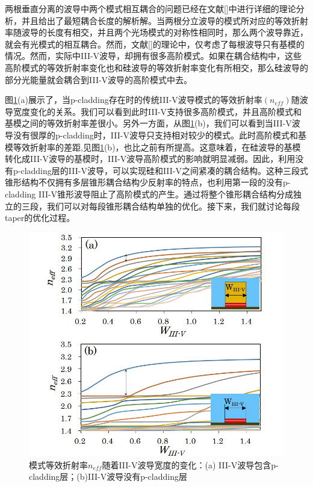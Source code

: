 两根垂直分离的波导中两个模式相互耦合的问题已经在文献[]中进行详细的理论分析，并且给出了最短耦合长度的解析解。当两根分立波导的模式所对应的等效折射率随波导的长度有相交，并且两个光场模式的对称性相同时，那么两个波导靠近，就会有光模式的相互耦合。然而，文献[]的理论中，仅考虑了每根波导只有基模的情况。然而，实际中III-V波导，却拥有很多高阶模式。如果在耦合结构中，这些高阶模式的等效折射率变化也和硅波导的等效折射率变化有所相交，那么硅波导的部分光能量就会耦合到III-V波导的高阶模式中去。

图\ref{fig_ch3_multimode}(a)展示了，当p-cladding存在时的传统III-V波导模式的等效折射率$(n_{eff})$随波导宽度变化的关系。我们可以看到此时III-V支持很多高阶模式，并且高阶模式和基模之间的等效折射率差很小。另外一方面，从图\ref{fig_ch3_multimode}(b)，我们可以看到当III-V波导没有很厚的p-cladding时，III-V波导只支持相对较少的模式。此时高阶模式和基模等效折射率的差距,见图\ref{fig_ch3_multimode}(b)，也比之前有所提高。这意味着，在硅波导的基模转化成III-V波导的基模时，III-V波导高阶模式的影响就明显减弱。因此，利用没有p-cladding层的III-V波导，可以实现硅和III-V之间紧凑的耦合结构。这种三段式锥形结构不仅拥有多层锥形耦合结构少反射率的特点\cite{kurczveil2013characterization}，也利用第一段的没有p-cladding III-V锥形波导阻止了高阶模式的产生。通过将整个锥形耦合结构分成独立的三段，我们可以对每段锥形耦合结构单独的优化。接下来，我们就讨论每段taper的优化过程。

\begin{figure}[htb]
	\centering
	\includegraphics[width=12cm]{./Pictures/fig_ch3_multimode.jpg}
	\caption{模式等效折射率$n_{eff}$随着III-V波导宽度的变化：(a) III-V波导包含p-cladding层；(b)III-V波导没有p-cladding层}
	\label{fig_ch3_multimode}
\end{figure}

